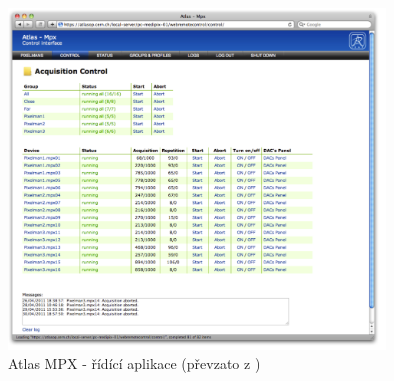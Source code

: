 \begin{figure}[ht]
	\begin{center}
		\includegraphics[width=10cm]{figures/mpx_web.png}
		\caption{Atlas MPX - řídící aplikace (převzato z \cite{TurecekThesis2011})}
		\label{fig:mpx_web}
	\end{center}
\end{figure}



